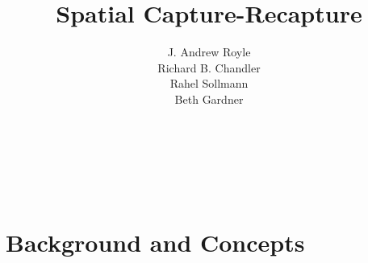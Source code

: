 \documentclass{book}
\begin{document}
\title{ Spatial Capture-Recapture  }
\subtitle{
}
\author{J. Andrew Royle \\
Richard B. Chandler \\
Rahel Sollmann \\
Beth Gardner}


\address{
USGS Patuxent Wildlife Research Center \\
North Carolina State University
}

\maketitle

\newpage


\setcounter{tocdepth}{2}
\tableofcontents


\newpage

\hspace*{-.166in}{\LARGE Preface} \\

\vspace*{.2in}


\newpage

\hspace*{-.166in}{\LARGE Acknowledgements} \\

\vspace*{.2in}

%

\newpage



\mainmatter




\part{Background and Concepts}


\end{document}
